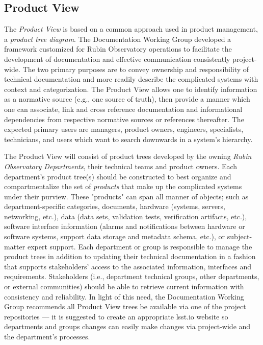 \subsection{Product View}

The \emph{Product View} is based on a common approach used in product management, a \emph{product tree diagram}.
The Documentation Working Group developed a framework customized for Rubin Observatory operations to facilitate the development of documentation and effective communication consistently project-wide.
The two primary purposes are to convey ownership and responsibility of technical documentation and more readily describe the complicated systems with context and categorization.
The Product View allows one to identify information as a normative source (e.g., one source of truth), then provide a manner which one can associate, link and cross reference documentation and informational dependencies from respective normative sources or references thereafter.
The expected primary users are managers, product owners, engineers, specialists, technicians, and users which want to search downwards in a system's hierarchy.

The Product View will consist of product trees developed by the owning \emph{Rubin Observatory Departments}, their technical teams and product owners.
Each department's product tree(s) should be constructed to best organize and compartmentalize the set of \emph{products} that make up the complicated systems under their purview.
These "products" can span all manner of objects; such as department-specific categories, documents, hardware (systems, servers, networking, etc.), data (data sets, validation tests, verification artifacts, etc.), software interface information (alarms and notifications between hardware or software systems, support data storage and metadata schema, etc.), or subject-matter expert support.
Each department or group is responsible to manage the product trees in addition to updating their technical documentation in a fashion that supports stakeholders' access to the associated information, interfaces and requirements.
Stakeholders (i.e., department technical groups, other departments, or external communities) should be able to retrieve current information with consistency and reliability.
In light of this need, the Documentation Working Group recommends all Product View trees be available via one of the project repositories --- it is suggested to create an appropriate lsst.io website so departments and groups changes can easily make changes via project-wide and the department's processes.

